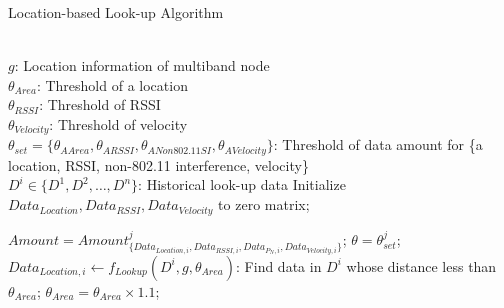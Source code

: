 \begin{algorithm}
\caption{Location-based Look-up Algorithm}
\label{algorithms: Location}
\begin{algorithmic}[1]
\REQUIRE  ~~\\
	 $g$: Location information of multiband node\\
	 $\theta_{Area}$: Threshold of a location\\
	 $\theta_{RSSI}$: Threshold of RSSI\\
	 $\theta_{Velocity}$: Threshold of velocity\\
	 $\theta_{set} = \{\theta_{A Area},\theta_{A RSSI},\theta_{A Non 802.11 SI},\theta_{A Velocity}\}$: Threshold of data amount for \{a location, RSSI, non-802.11 interference, velocity\}\\
	 $D^i \in \{D^1,D^2,\dots,D^n\}$: Historical look-up data
\STATE Initialize \emph{$Data_{Location}, Data_{RSSI}, Data_{Velocity}$} to zero matrix;


\STATE $Amount = Amount_{\{Data_{Location,i},Data_{RSSI,i},Data_{P_N,i},Data_{Velocity,i}\}}^j$;
\STATE $\theta = \theta_{set}^j$;
\STATE $Data_{Location,i} \leftarrow f_{Lookup}(D^i,g,\theta_{Area})$: Find data in $D^i$ whose distance less than $\theta_{Area}$;
\STATE $\theta_{Area}=\theta_{Area} \times 1.1$;
\ENDWHILE

%



\end{algorithmic}
\end{algorithm}
